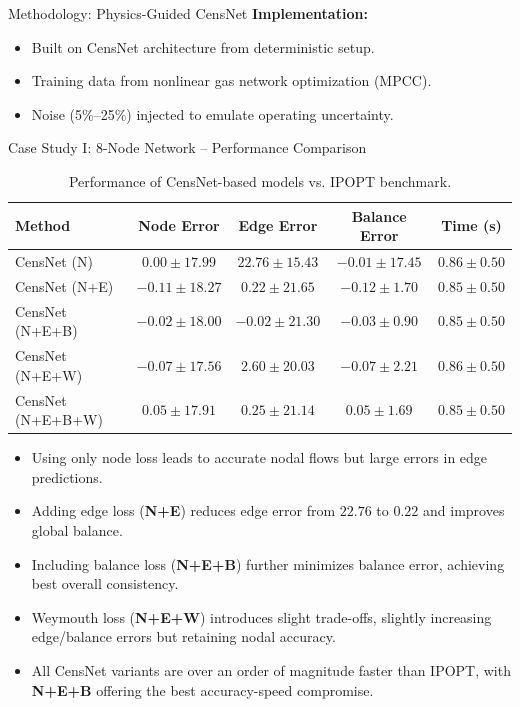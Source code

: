 \documentclass[hyperref={colorlinks,citecolor=blue,linkcolor=blue,urlcolor=blue}]{beamer}
\begin{document}
\begin{frame}{Methodology: Physics-Guided CensNet}
\textbf{Implementation:}
\begin{itemize}
    \item Built on CensNet architecture from deterministic setup.
    \item Training data from nonlinear gas network optimization (MPCC).
    \item Noise (5\%–25\%) injected to emulate operating uncertainty.
\end{itemize}

\centering
    \resizebox{0.9\linewidth}{!}{}
\end{frame}




\begin{frame}{Case Study I: 8-Node Network -- Performance Comparison}
\scriptsize
\centering
\begin{table}
\captionsetup{font=scriptsize}  %
\centering
\begin{tabular}{lcccc}
\toprule
\textbf{Method} & \textbf{Node Error} & \textbf{Edge Error} & \textbf{Balance Error} & \textbf{Time (s)} \\
\midrule
CensNet (N) & $0.00 \pm 17.99$ & $22.76 \pm 15.43$ & $-0.01 \pm 17.45$ & $0.86 \pm 0.50$ \\
CensNet (N+E) & $-0.11 \pm 18.27$ & $0.22 \pm 21.65$ & $-0.12 \pm 1.70$ & $0.85 \pm 0.50$ \\
CensNet (N+E+B) & $-0.02 \pm 18.00$ & $-0.02 \pm 21.30$ & $-0.03 \pm 0.90$ & $0.85 \pm 0.50$ \\
CensNet (N+E+W) & $-0.07 \pm 17.56$ & $2.60 \pm 20.03$ & $-0.07 \pm 2.21$ & $0.86 \pm 0.50$ \\
CensNet (N+E+B+W) & $0.05 \pm 17.91$ & $0.25 \pm 21.14$ & $0.05 \pm 1.69$ & $0.85 \pm 0.50$ \\
\bottomrule
\end{tabular}
\caption{Performance of CensNet-based models vs. IPOPT benchmark.}
\end{table}

\begin{itemize}
    \item Using only node loss leads to accurate nodal flows but large errors in edge predictions.
    \item Adding edge loss (\textbf{N+E}) reduces edge error from $22.76$ to $0.22$ and improves global balance.
    \item Including balance loss (\textbf{N+E+B}) further minimizes balance error, achieving best overall consistency.
    \item Weymouth loss (\textbf{N+E+W}) introduces slight trade-offs, slightly increasing edge/balance errors but retaining nodal accuracy.
    \item All CensNet variants are over an order of magnitude faster than IPOPT, with \textbf{N+E+B} offering the best accuracy-speed compromise.
\end{itemize}

\end{frame}
\end{document}
